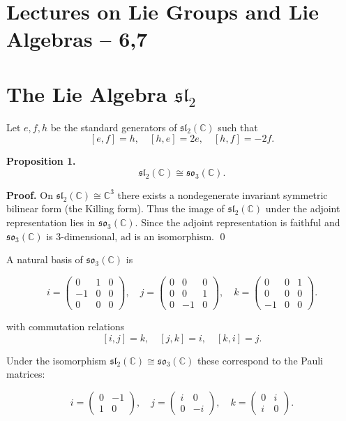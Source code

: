 \section*{Lectures on Lie Groups and Lie Algebras – 6,7}

\section*{The Lie Algebra $\mathfrak{sl}_2$}

Let $e,f,h$ be the standard generators of $\mathfrak{sl}_2(\mathbb{C})$ such that
\[
[e,f] = h, \quad [h,e] = 2e, \quad [h,f] = -2f.
\]

\textbf{Proposition 1.}
\[
\mathfrak{sl}_2(\mathbb{C}) \cong \mathfrak{so}_3(\mathbb{C}).
\]

\textbf{Proof.}
On $\mathfrak{sl}_2(\mathbb{C}) \cong \mathbb{C}^3$ there exists a nondegenerate invariant symmetric bilinear form (the Killing form). Thus the image of $\mathfrak{sl}_2(\mathbb{C})$ under the adjoint representation lies in $\mathfrak{so}_3(\mathbb{C})$. Since the adjoint representation is faithful and $\mathfrak{so}_3(\mathbb{C})$ is 3-dimensional, $\mathrm{ad}$ is an isomorphism.
\qed

A natural basis of $\mathfrak{so}_3(\mathbb{C})$ is

\[
i =
\begin{pmatrix}
0&1&0\\
-1&0&0\\
0&0&0
\end{pmatrix}, \quad
j =
\begin{pmatrix}
0&0&0\\
0&0&1\\
0&-1&0
\end{pmatrix}, \quad
k =
\begin{pmatrix}
0&0&1\\
0&0&0\\
-1&0&0
\end{pmatrix}.
\]

with commutation relations
\[
[i,j]=k, \quad [j,k]=i, \quad [k,i]=j.
\]

Under the isomorphism $\mathfrak{sl}_2(\mathbb{C}) \cong \mathfrak{so}_3(\mathbb{C})$
these correspond to the Pauli matrices:

\[
i=
\begin{pmatrix}
0&-1\\
1&0
\end{pmatrix}, \quad
j=
\begin{pmatrix}
i&0\\
0&-i
\end{pmatrix}, \quad
k=
\begin{pmatrix}
0&i\\
i&0
\end{pmatrix}.
\]

